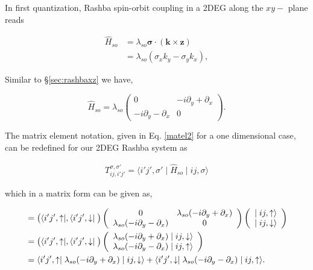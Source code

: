 \documentclass[10pt,prb,showpacs,amssymb,floatfix]{revtex4-1}
\newcommand{\nn}{\nonumber}
\newcommand{\lam}{\lambda}
\newcommand{\sg}{\sigma}
\begin{document}
In first quantization, Rashba spin-orbit coupling in a 2DEG along the $xy-$ plane reads 

\begin{align}
\hat H_{so} &= \lam_{so} \bm \sg \cdot (\bm k \times \bm z) \nn\\
&=\lambda_{so} (\sigma_x k_y - \sigma_y k_x),
\label{alpxy}
\end{align}

Similar to \S \ref{sec:rashbaxz} we have, 

\begin{equation}
\hat H_{so} =  \lambda_{so} \left(\begin{array}{cc} 
0 & -i\partial_y + \partial_x\\
-i\partial_y - \partial_x & 0
\end{array}\right).
\label{eq11}
\end{equation}

The matrix element notation, given in Eq. \eqref{matel2} for a one dimensional case, can be redefined for our 2DEG Rashba system as 

\begin{align}
T_{ij,i'j'}^{\sigma,\sigma'} = \langle i'j',\sigma' \mid \hat{H}_{so} \mid ij, \sigma \rangle
\end{align}

which in a matrix form can be given as,

\begin{align}
&=  \big{(} \langle i'j',\uparrow \mid , \langle i'j',\downarrow \mid \big{)} \left(\begin{array}{cc} 
0 &  \lambda_{so} (-i\partial_y + \partial_x)\\
 \lambda_{so}(-i\partial_y - \partial_x) & 0
\end{array}\right)  \left(\begin{array}{c} 
\mid ij,\uparrow \rangle \\
\mid ij,\downarrow \rangle
\end{array}\right) \\
&= \big{(}\langle i'j',\uparrow \mid , \langle i'j',\downarrow \mid \big{)}  \left(\begin{array}{c} 
\lambda_{so}(-i\partial_y + \partial_x) \mid ij,\downarrow \rangle \\
\lambda_{so}(-i\partial_y - \partial_x) \mid ij,\uparrow \rangle
\end{array}\right) \\
&= \langle i'j',\uparrow \mid  \lambda_{so}(-i\partial_y + \partial_x) \mid ij,\downarrow \rangle +
 \langle i'j',\downarrow \mid \lambda_{so}(-i\partial_y - \partial_x) \mid ij,\uparrow \rangle.
\label{eq12}
\end{align}
\end{document}

